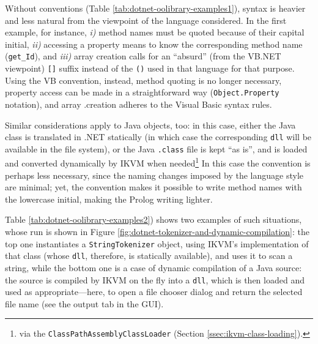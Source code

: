 \noindent Without conventions (Table \ref{tab:dotnet-oolibrary-examples1}), syntax is heavier and less natural from the viewpoint of the language considered.
In the first example, for instance, \textit{i)} method names must be quoted because of their capital initial, \textit{ii)} accessing a property means to know the corresponding method name (\texttt{get\_Id}), and \textit{iii)} array creation calls for an ``absurd'' (from the VB.NET viewpoint) \texttt{[]} suffix instead of the \texttt{()} used in that language for that purpose.
Using the VB convention, instead, method quoting is no longer necessary, property access can be made in a straightforward way (\texttt{Object.Property} notation), and array .creation adheres to the Visual Basic syntax rules.


Similar considerations apply to Java objects, too: in this case, either the Java class is translated in .NET statically (in which case the corresponding \texttt{dll} will be available in the file system), or the Java \texttt{.class} file is kept ``as is'', and is loaded and converted dynamically by IKVM when needed\footnote{via the \texttt{ClassPathAssemblyClassLoader} (Section \ref{ssec:ikvm-class-loading}).}
In this case the convention is perhaps less necessary, since the naming changes imposed by the language style are minimal; yet, the convention makes it possible to write method names with the lowercase initial, making the Prolog writing lighter.

Table \ref{tab:dotnet-oolibrary-examples2}) shows two examples of such situations, whose run is shown in Figure \ref{fig:dotnet-tokenizer-and-dynamic-compilation}: the top one instantiates a \texttt{StringTokenizer} object, using IKVM's implementation of that class (whose \texttt{dll}, therefore, is statically available), and uses it to scan a string, while the bottom one is a case of dynamic compilation of a Java source: the source is compiled by IKVM on the fly into a \texttt{dll}, which is then loaded and used as appropriate---here, to open a file chooser dialog and return the selected file name (see the output tab in the GUI).

